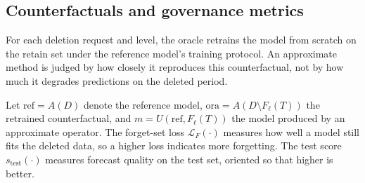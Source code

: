 
\subsection{Counterfactuals and governance metrics}

For each deletion request and level, the oracle retrains the model from
scratch on the retain set under the reference model's training
protocol. An approximate method is judged by how closely it reproduces
this counterfactual, not by how much it degrades predictions on the
deleted period.

Let $\text{ref} = A(D)$ denote the reference model,
$\text{ora} = A(D \setminus F_\ell(T))$ the retrained counterfactual,
and $m = U(\text{ref}, F_\ell(T))$ the model produced by an approximate
operator. The forget-set loss $\mathcal{L}_F(\cdot)$ measures how
well a model still fits the deleted data, so a higher loss indicates
more forgetting. The test score $s_{\text{test}}(\cdot)$
measures forecast quality on the test set, oriented so that higher is
better.

